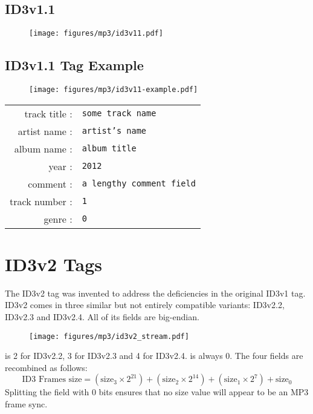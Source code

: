 \subsection{ID3v1.1}

\begin{figure}[h]
\texttt{[image: figures/mp3/id3v11.pdf]}
\end{figure}

\clearpage

\subsection{ID3v1.1 Tag Example}
\begin{figure}[h]
  \texttt{[image: figures/mp3/id3v11-example.pdf]}
\end{figure}
\begin{table}[h]
  \begin{tabular}{rl}
    track title : & \texttt{some track name} \\
    artist name : & \texttt{artist's name} \\
    album name : & \texttt{album title} \\
    year : & \texttt{2012} \\
    comment : & \texttt{a lengthy comment field} \\
    track number : & \texttt{1} \\
    genre : & \texttt{0} \\
  \end{tabular}
\end{table}

\clearpage

\section{ID3v2 Tags}

The ID3v2 tag was invented to address the deficiencies in the original
ID3v1 tag.
ID3v2 comes in three similar but not entirely compatible variants:
ID3v2.2, ID3v2.3 and ID3v2.4.
All of its fields are big-endian.

\begin{figure}[h]
\texttt{[image: figures/mp3/id3v2\_stream.pdf]}
\end{figure}
\par
\noindent
{} is 2 for ID3v2.2, 3 for ID3v2.3 and 4 for ID3v2.4.
 is always 0.
The four  fields are recombined as follows:
\begin{equation*}
  \text{ID3 Frames size} = (\text{size}_3 \times 2 ^ {21}) + (\text{size}_2 \times 2 ^ {14}) + (\text{size}_1 \times 2 ^ 7) + \text{size}_0
\end{equation*}
Splitting the field with 0 bits ensures that no size value
will appear to be an MP3 frame sync.


